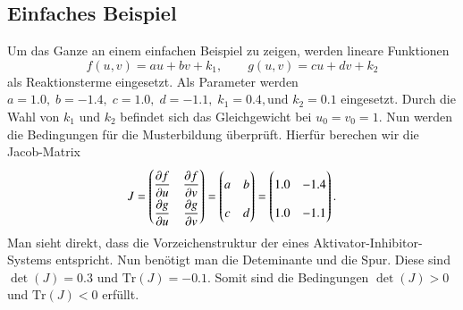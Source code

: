 \subsection{Einfaches Beispiel}
%
Um das Ganze an einem einfachen Beispiel zu zeigen, werden lineare Funktionen
\begin{equation}
f(u, v) = a u + b v + k_1, \qquad
g(u, v) = c u + d v + k_2
\label{reaktdiff:equ:ownreakterm}
\end{equation}
als Reaktionsterme eingesetzt.
Als Parameter werden \( a = 1.0,\; b = -1.4,\; c = 1.0,\; d = -1.1,\; k_1 = 0.4,\text{und }k_2 = 0.1 \) eingesetzt.
Durch die Wahl von \(k_1\) und \(k_2\) befindet sich das Gleichgewicht bei \(u_0 = v_0 = 1\).
Nun werden die Bedingungen für die Musterbildung überprüft.
%
Hierfür berechen wir die Jacob-Matrix
\begin{equation*}
        J =
\bgroup\renewcommand{\arraystretch}{1.9}
        \begin{pmatrix}
	\displaystyle
        \frac{\partial f}{\partial u} &
	\displaystyle
	\frac{\partial f}{\partial v} \\
	\displaystyle
        \frac{\partial g}{\partial u} &
	\displaystyle
	\frac{\partial g}{\partial v}
        \end{pmatrix}
\egroup
        =
        \begin{pmatrix}
        a & b \\
        c & d
        \end{pmatrix}
        =
        \begin{pmatrix}
        1.0 & -1.4 \\
        1.0 & -1.1
        \end{pmatrix}.
\end{equation*}
Man sieht direkt, dass die Vorzeichenstruktur der eines Aktivator-Inhibitor-Systems entspricht.
Nun benötigt man die Deteminante und die Spur.
Diese sind \(\det(J) = 0.3\) und \(\text{Tr}(J) = -0.1\).
Somit sind die Bedingungen \(\det(J) > 0\) und \(\text{Tr}(J) <0\) erfüllt.


